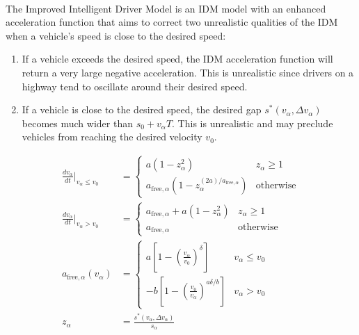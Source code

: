 \documentclass[12pt]{article}
\begin{document}
\paragraph{}
The Improved Intelligent Driver Model is an IDM model with an enhanced acceleration function that aims to correct two unrealistic qualities of the IDM when a vehicle's speed is close to the desired speed:
\begin{enumerate}
  \item 
  If a vehicle exceeds the desired speed, the IDM acceleration function will return a very large negative acceleration.  This is unrealistic since drivers on a highway tend to oscillate around their desired speed.  
  \item
  If a vehicle is close to the desired speed, the desired gap $s^*(v_\alpha,\Delta v_\alpha)$ becomes much wider than $s_0 + v_\alpha T$.  This is unrealistic and may preclude vehicles from reaching the desired velocity $v_0$.
\end{enumerate}
\begin{mymathbox}[ams gather, title=IIDM Governing Functions, colframe=blue!30!black]
  \begin{align}
  \frac{dv_\alpha}{dt}\Bigr|_{v_\alpha\le v_0}&= 
  \begin{cases}
    a (1-z_\alpha^2) & z_\alpha \ge 1\\
   a_{\text{free},\alpha}(1 - z_\alpha^{(2a)/a_{\text{free},\alpha}})& \text{otherwise}
  \end{cases}
  \\
  \frac{dv_\alpha}{dt}\Bigr|_{v_\alpha> v_0}&= 
  \begin{cases}
    a_{\text{free},\alpha} + a (1-z_\alpha^2) & z_\alpha \ge 1\\
    a_{\text{free},\alpha} & \text{otherwise}
  \end{cases}\\
  a_{\text{free},\alpha}(v_\alpha)&= \begin{cases}
  a \left[ 1 - (\frac{v_\alpha}{v_0})^\delta \right] & v_\alpha \le v_0\\
  -b \left[ 1 - (\frac{v_0}{v_\alpha})^{a\delta/b} \right] & v_\alpha > v_0
  \end{cases}\\
  z_\alpha&= \frac{s^*(v_\alpha, \Delta v_\alpha)}{s_\alpha}
  \end{align}
\end{mymathbox}
\end{document}
